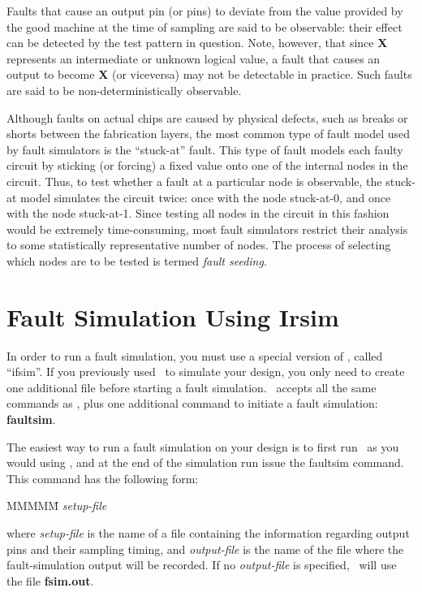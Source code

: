 Faults that cause an output pin (or pins) to deviate from the value provided
by the good machine at the time of sampling are said to be observable: their
effect can be detected by the test pattern in question.  Note, however, that
since {\bf X} represents an intermediate or unknown logical value, a fault
that causes an output to become {\bf X} (or viceversa) may not be detectable
in practice.  Such faults are said to be non-deterministically observable.

Although faults on actual chips are caused by physical defects, such as
breaks or shorts between the fabrication layers, the most common type of
fault model used by fault simulators is the ``stuck-at'' fault.  This type
of fault models each faulty circuit by sticking (or forcing) a fixed value
onto one of the internal nodes in the circuit.  Thus, to test whether a
fault at a particular node is observable, the stuck-at model simulates the
circuit twice: once with the node stuck-at-0, and once with the node
stuck-at-1.  Since testing all nodes in the circuit in this fashion would be
extremely time-consuming, most fault simulators restrict their analysis to
some statistically representative number of nodes.  The process of selecting
which nodes are to be tested is termed {\em fault seeding}.

\section{Fault Simulation Using Irsim}

In order to run a fault simulation, you must use a special version of
\irsim, called ``ifsim''.  If you previously used \irsim\ to simulate your
design, you only need to create one additional file before starting a fault
simulation.  \ifsim\ accepts all the same commands as \irsim, plus one
additional command to initiate a fault simulation: {\bf faultsim}.

The easiest way to run a fault simulation on your design is to first run
\ifsim\ as you would using \irsim, and at the end of the simulation run issue
the faultsim command.  This command has the following form:

\begin{tabbing}
MMMMM\= \kill
{} {\em setup-file} 
\end{tabbing}

\noindent where {\em setup-file} is the name of a file containing the
information regarding output pins and their sampling timing, and {\em
output-file} is the name of the file where the fault-simulation output will
be recorded.  If no {\em output-file} is specified, \ifsim\ will use the
file {\bf fsim.out}.


